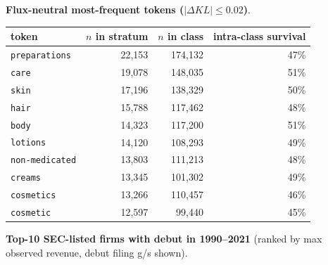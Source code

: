 \textbf{Flux-neutral most-frequent tokens ($|\Delta KL|\leq 0.02$)}.

\begin{tabular}{lrrr}
\toprule
token & $n$ in stratum & $n$ in class & intra-class survival \\
\midrule
\texttt{preparations} & 22,153 & 174,132 & 47\% \\
\texttt{care} & 19,078 & 148,035 & 51\% \\
\texttt{skin} & 17,196 & 138,329 & 50\% \\
\texttt{hair} & 15,788 & 117,462 & 48\% \\
\texttt{body} & 14,323 & 117,200 & 51\% \\
\texttt{lotions} & 14,120 & 108,293 & 49\% \\
\texttt{non-medicated} & 13,803 & 111,213 & 48\% \\
\texttt{creams} & 13,345 & 101,302 & 49\% \\
\texttt{cosmetics} & 13,266 & 110,457 & 46\% \\
\texttt{cosmetic} & 12,597 & 99,440 & 45\% \\
\bottomrule
\end{tabular}

\textbf{Top-10 SEC-listed firms with debut in 1990--2021} (ranked by max observed revenue, debut filing g/s shown).

